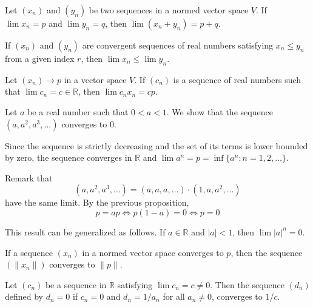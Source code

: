\begin{proposition}
	Let $(x_n)$ and $(y_n)$ be two sequences in a normed vector space $V$. If $\lim x_n = p$ and $\lim y_n = q$, then $\lim (x_n + y_n) = p + q$.
\end{proposition}

\begin{corollary}
	If $(x_n)$ and $(y_n)$ are convergent sequences of real numbers satisfying $x_n \leq y_n$ from a given index $r$, then $\lim x_n \leq \lim y_n$.
\end{corollary}

\begin{proposition}
	Let $(x_n) \longrightarrow p$ in a vector space $V$. If $(c_n)$ is a sequence of real numbers such that $\lim c_n = c \in \mathbb{R}$, then $\lim c_n x_n = c p$.
\end{proposition}

\begin{example}
	Let $a$ be a real number such that $0 < a < 1$. We show that the sequence $(a, a^2, a^3, \ldots)$ converges to $0$. 

	Since the sequence is strictly decreasing and the set of its terms is lower bounded by zero, the sequence converges in $\mathbb{R}$ and $\lim a^n = p = \inf \{ a^n : n = 1, 2, \ldots \}$.

	Remark that
	\[
		(a, a^2, a^3, \ldots) = (a, a, a, \ldots) \cdot (1, a, a^2, \ldots)
	\]
	have the same limit. By the previous proposition,
	\[
		p = ap \iff p(1-a) = 0 \iff p = 0
	\]

	This result can be generalized as follows. If $a \in \mathbb{R}$ and $|a| < 1$, then $\lim |a|^n = 0$.
\end{example}

\begin{lemma}
	If a sequence $(x_n)$ in a normed vector space converges to $p$, then the sequence $(\| x_n \|)$ converges to $\| p \|$.
\end{lemma}

\begin{proposition}
	Let $(c_n)$ be a sequence in $\mathbb{R}$ satisfying $\lim c_n = c \neq 0$. Then the sequence $(d_n)$ defined by $d_n = 0$ if $c_n = 0$ and $d_n = 1/a_n$ for all $a_n \neq 0$, converges to $1/c$.
\end{proposition}


